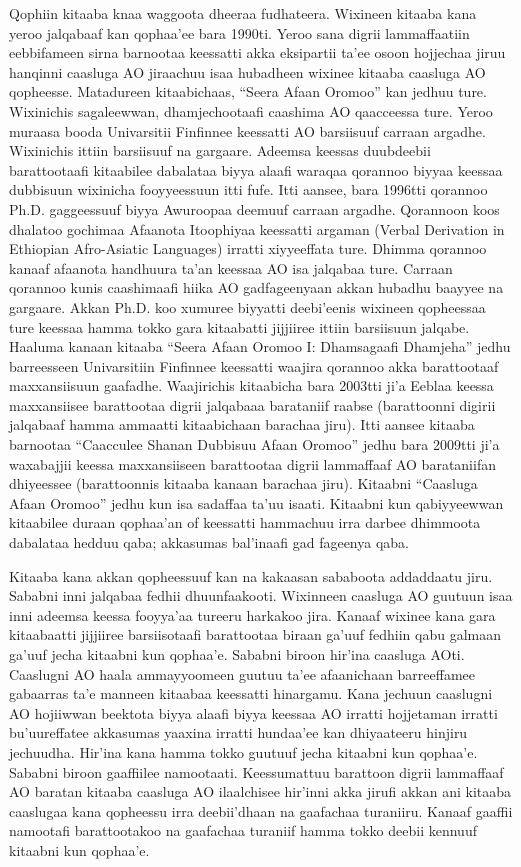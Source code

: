 \documentclass[11pt,b5paper]{book}
\begin{document}
Qophiin kitaaba knaa waggoota dheeraa fudhateera. Wixineen kitaaba kana yeroo jalqabaaf kan qophaa’ee bara 1990ti. Yeroo sana digrii lammaffaatiin eebbifameen sirna
barnootaa keessatti akka eksipartii ta’ee osoon hojjechaa jiruu hanqinni caasluga AO jiraachuu isaa hubadheen wixinee kitaaba caasluga AO qopheesse. Matadureen kitaabichaas,
“Seera Afaan Oromoo” kan jedhuu ture. Wixinichis sagaleewwan, dhamjechootaafi caashima AO qaacceessa ture. Yeroo muraasa booda Univarsitii Finfinnee keessatti AO
barsiisuuf carraan argadhe. Wixinichis ittiin barsiisuuf na gargaare. Adeemsa keessas duubdeebii barattootaafi kitaabilee dabalataa biyya alaafi waraqaa qorannoo biyyaa
keessaa dubbisuun wixinicha fooyyeessuun itti fufe. Itti aansee, bara 1996tti qorannoo Ph.D. gaggeessuuf biyya Awuroopaa deemuuf carraan argadhe. Qorannoon koos dhalatoo
gochimaa Afaanota Itoophiyaa keessatti argaman (Verbal Derivation in Ethiopian Afro-Asiatic Languages) irratti xiyyeeffata ture. Dhimma qorannoo kanaaf afaanota handhuura ta’an keessaa AO isa jalqabaa ture. Carraan qorannoo kunis caashimaafi hiika AO gadfageenyaan akkan hubadhu baayyee na gargaare. Akkan Ph.D. koo xumuree biyyatti deebi’eenis wixineen qopheessaa ture keessaa hamma tokko gara kitaabatti jijjiiree ittiin barsiisuun jalqabe. Haaluma kanaan kitaaba “Seera Afaan Oromoo I: Dhamsagaafi Dhamjeha” jedhu barreesseen Univarsitiin Finfinnee keessatti waajira qorannoo akka barattootaaf maxxansiisuun gaafadhe. Waajirichis kitaabicha bara 2003tti ji’a Eeblaa keessa maxxansiisee barattootaa digrii jalqabaaa barataniif raabse
(barattoonni digirii jalqabaaf hamma ammaatti kitaabichaan barachaa jiru). Itti aansee kitaaba barnootaa “Caacculee Shanan Dubbisuu Afaan Oromoo” jedhu bara 2009tti ji’a
waxabajjii keessa maxxansiiseen barattootaa digrii lammaffaaf AO barataniifan dhiyeessee (barattoonnis kitaaba kanaan barachaa jiru). Kitaabni “Caasluga Afaan Oromoo” jedhu kun
isa sadaffaa ta’uu isaati. Kitaabni kun qabiyyeewwan kitaabilee duraan qophaa’an of keessatti hammachuu irra darbee dhimmoota dabalataa hedduu qaba; akkasumas bal’inaafi gad
fageenya qaba.

Kitaaba kana akkan qopheessuuf kan na kakaasan sababoota addaddaatu jiru. Sababni inni jalqabaa fedhii dhuunfaakooti. Wixinneen caasluga AO guutuun isaa inni adeemsa keessa
fooyya’aa tureeru harkakoo jira. Kanaaf wixinee kana gara kitaabaatti jijjiiree barsiisotaafi barattootaa biraan ga’uuf fedhiin qabu galmaan ga’uuf jecha kitaabni kun qophaa’e.
Sababni biroon hir’ina caasluga AOti. Caaslugni AO haala ammayyoomeen guutuu ta’ee afaanichaan barreeffamee gabaarras ta’e manneen kitaabaa keessatti hinargamu. Kana
jechuun caaslugni AO hojiiwwan beektota biyya alaafi biyya keessaa AO irratti hojjetaman irratti bu’uureffatee akkasumas yaaxina irratti hundaa’ee kan dhiyaateeru hinjiru jechuudha.
Hir’ina kana hamma tokko guutuuf jecha kitaabni kun qophaa’e. Sababni biroon gaaffiilee namootaati. Keessumattuu barattoon digrii lammaffaaf AO baratan kitaaba caasluga AO ilaalchisee
hir’inni akka jirufi akkan ani kitaaba caaslugaa kana qopheessu irra deebii’dhaan na gaafachaa turaniiru. Kanaaf gaaffii namootafi barattootakoo na gaafachaa turaniif hamma tokko
deebii kennuuf kitaabni kun qophaa’e.
\end{document}
